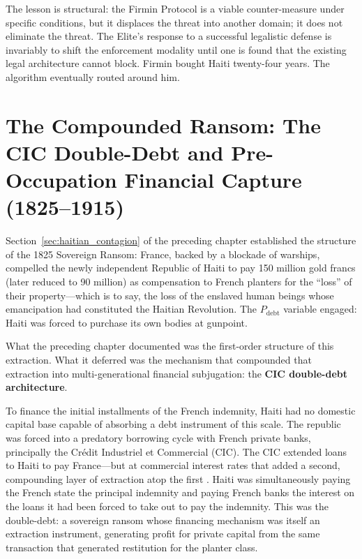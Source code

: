 The lesson is structural: the Firmin Protocol is a viable counter-measure under specific conditions, but it displaces the threat into another domain; it does not eliminate the threat. The Elite's response to a successful legalistic defense is invariably to shift the enforcement modality until one is found that the existing legal architecture cannot block. Firmin bought Haiti twenty-four years. The algorithm eventually routed around him.

\section{The Compounded Ransom: The CIC Double-Debt and Pre-Occupation Financial Capture (1825--1915)}
\label{sec:cic_double_debt}

Section~\ref{sec:haitian_contagion} of the preceding chapter established the structure of the 1825 Sovereign Ransom: France, backed by a blockade of warships, compelled the newly independent Republic of Haiti to pay 150 million gold francs (later reduced to 90 million) as compensation to French planters for the ``loss'' of their property---which is to say, the loss of the enslaved human beings whose emancipation had constituted the Haitian Revolution. The $P_{\text{debt}}$ variable engaged: Haiti was forced to purchase its own bodies at gunpoint.

What the preceding chapter documented was the first-order structure of this extraction. What it deferred was the mechanism that compounded that extraction into multi-generational financial subjugation: the \textbf{CIC double-debt architecture}.

To finance the initial installments of the French indemnity, Haiti had no domestic capital base capable of absorbing a debt instrument of this scale. The republic was forced into a predatory borrowing cycle with French private banks, principally the Crédit Industriel et Commercial (CIC). The CIC extended loans to Haiti to pay France---but at commercial interest rates that added a second, compounding layer of extraction atop the first \cite{nyt_ransom2022}. Haiti was simultaneously paying the French state the principal indemnity and paying French banks the interest on the loans it had been forced to take out to pay the indemnity. This was the double-debt: a sovereign ransom whose financing mechanism was itself an extraction instrument, generating profit for private capital from the same transaction that generated restitution for the planter class.

